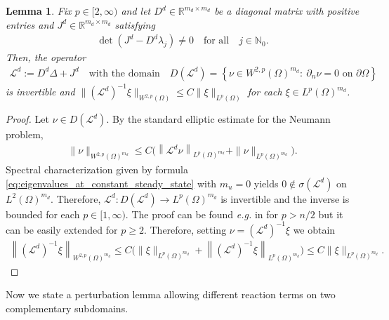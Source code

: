 \documentclass[12pt, a4paper]{amsart}
\numberwithin{equation}{section}
\newcommand{\RR}{\mathbb{R}}
\newcommand{\NN}{\mathbb{N}}
\newcommand{\mn}{m_{u}}  %
\newcommand{\md}{m_{d}}  %
\renewcommand{\L}{{\mathcal{L}}}
\newtheorem{lemma}[theorem]{\bf Lemma}
\begin{document}
\begin{lemma}
	\label{DisLemma1} 
    Fix $p\in [2, \infty)$ and let $ D^d\in\RR^{\md\times \md}$ be a diagonal matrix with positive entries and $J^d \in \RR^{\md\times \md}$ satisfying 
    \begin{align}
    \det(J^d - D^d\lambda_j) \neq 0 \quad \text{for all} \quad j\in\NN_0.
    \end{align}
    Then, the operator 
    \begin{align}
        \L^d := D^d\Delta + J^d \quad \text{with the domain} \quad D\left(\mathcal L^d\right)=\left\{\nu\in W^{2,p}(\Omega)^{\md}:\ \partial_n \nu=0\text{ on }\partial\Omega\right\}
    \end{align} 
    is invertible and $\| (\L^d)^{-1} \xi\|_{W^{2,p}(\Omega)} \leqslant C \|\xi\|_{L^p(\Omega)}$ 
    for each $\xi \in L^p(\Omega)^{\md}$.
\end{lemma}

\begin{proof}
Let $\nu\in D(\mathcal L^d)$. By the standard elliptic estimate for the Neumann problem,
\begin{align}
\|\nu\|_{W^{2,p}(\Omega)^{m_d}}
\leqslant C\Big(\left\|\mathcal L^d \nu\right\|_{L^p(\Omega)^{m_d}}+\|\nu\|_{L^p(\Omega)^{m_d}}\Big).
\end{align}
Spectral characterization given by formula \eqref{eq:eigenvalues_at_constant_steady_state} with $\mn = 0$ yields $0\notin \sigma(\L^d)$ on $L^2(\Omega)^{\md}$.
Therefore, $\mathcal L^d:D(\mathcal L^d)\to L^p(\Omega)^{\md}$ is invertible and the inverse is bounded for each $p \in [1,\infty)$. The proof can be found \textit{e.g.} in \cite[Corollary 2.4]{KMMü23} for $p>n/2$ but it can be easily extended for $p\geqslant 2$.
Therefore, setting $\nu = (\L^{d})^{-1} \xi$ we obtain
\begin{align}
\left\|\left(\L^d\right)^{-1}\xi\right\|_{W^{2,p}(\Omega)^{m_d}}
\leqslant C\Big(\|\mathcal \xi\|_{L^p(\Omega)^{m_d}}+\left\|\left(\L^d\right)^{-1} \xi\right\|_{L^p(\Omega)^{m_d}}\Big) \leqslant C\|\mathcal \xi\|_{L^p(\Omega)^{m_d}}.
\end{align}
\end{proof}





Now we state a perturbation lemma allowing different reaction terms on two complementary subdomains.
\end{document}
